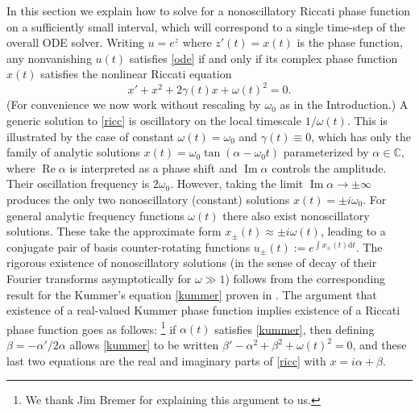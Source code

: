 \documentclass[10pt]{article}
\newcommand{\be}{\begin{equation}}
\newcommand{\ee}{\end{equation}}
\newcommand{\C}{\mathbb{C}}
\renewcommand{\d}{\mathrm{d}} %
\DeclareMathOperator{\im}{Im}
\DeclareMathOperator{\re}{Re}
\newcommand{\om}{\omega}
\newcommand{\g}{\gamma}
\newcommand{\AB}[1]{{\color{orange}#1}}
\begin{document}
%
In this section we explain how to solve for
a nonoscillatory Riccati phase function on a sufficiently small interval,
which will correspond to a single time-step of the overall ODE solver.
Writing $u = e^z$ where $z'(t) = x(t)$ is the phase function,
any nonvanishing $u(t)$ satisfies \cref{ode} if and only if
its complex phase function $x(t)$ satisfies the nonlinear Riccati equation
\be
x' + x^2 + 2\g(t)x + \om(t)^2 = 0.
\label{ricc}
\ee
(For convenience we now work without rescaling by $\om_0$ as in the
Introduction.)
A generic solution to \cref{ricc} is oscillatory
on the local timescale $1/\om(t)$.
This is illustrated by the case of constant $\om(t) = \om_0$
and $\g(t)\equiv 0$,
which has only the family of analytic solutions
$x(t) = \om_0 \tan(\alpha - \om_0t)$ parameterized by $\alpha\in\C$,
where $\re \alpha$ is interpreted as a phase shift and $\im \alpha$
controls the amplitude. Their oscillation frequency is $2\om_0$.
However, taking the limit $\im \alpha \to \pm \infty$ produces
the only two nonoscillatory (constant) solutions $x(t) = \pm i\om_0$.
For general analytic frequency functions $\om(t)$ there
also exist nonoscillatory solutions.
These take the approximate form
$x_{\pm}(t) \approx \pm i\om(t)$, leading to a conjugate pair of basis
counter-rotating functions $u_{\pm}(t) := e^{\int x_\pm(t) \d t}$.
The rigorous existence of nonoscillatory solutions
(in the sense of decay of their Fourier transforms asymptotically
for $\om\gg 1$)
follows from the corresponding result
for the Kummer's equation \cref{kummer} proven in
\cite{heitman2015,bremer2016}.
The argument that existence of a real-valued Kummer phase function implies
existence of a Riccati phase function goes as follows:%
\footnote{We thank Jim Bremer for explaining this argument to us.}
if $\alpha(t)$ satisfies \cref{kummer},
then defining $\beta = -\alpha'/2\alpha$ allows \cref{kummer}
to be written
$\beta' - \alpha^2 + \beta^2 + \om(t)^2 = 0$, and these last two equations
are the real and imaginary parts of \cref{ricc}
with $x = i\alpha + \beta$.
\end{document}
